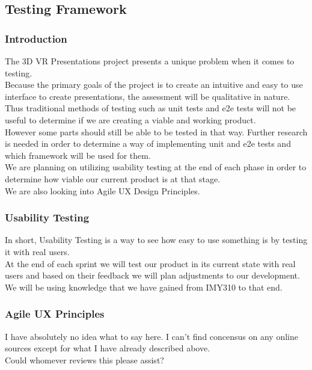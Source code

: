 \begin{flushleft}
\newpage
\subsection{Testing Framework}
	\subsubsection{Introduction}
		The 3D VR Presentations project presents a unique problem when it comes to testing.\\
		Because the primary goals of the project is to create an intuitive and easy to use interface to create presentations,
		the assessment will be qualitative in nature.\\
		Thus traditional methods of testing such as unit tests and e2e tests will not be useful to determine if we are creating a viable and working product.\\
		However some parts should still be able to be tested in that way. Further research is needed in order to determine a way of implementing unit and e2e tests and which framework will be used for them.\\
		We are planning on utilizing usability testing at the end of each phase in order to determine how viable our current product is at that stage.\\
		We are also looking into Agile UX Design Principles.

	\subsubsection{Usability Testing}
		In short, Usability Testing is a way to see how easy to use something is by testing it with real users.\\
		At the end of each sprint we will test our product in its current state with real users and based on their feedback we will plan adjustments to our development.
		We will be using knowledge that we have gained from IMY310 to that end.

	\subsubsection{Agile UX Principles}
		I have absolutely no idea what to say here. I can't find concensus on any online sources except for what I have already described above.\\
		Could whomever reviews this please assist?


\end{flushleft}
